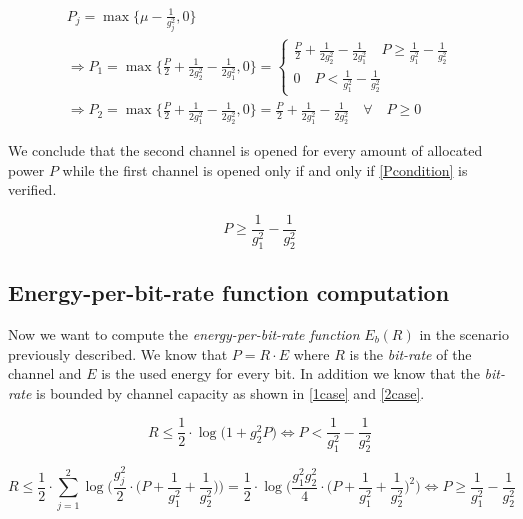 \begin{equation}
	\begin{gathered}
	 P_j = \max\Big\{\mu - \frac{1}{g_j^2},0\Big\} \\
	 \Rightarrow P_1= \max\Big\{\frac{P}{2} + \frac{1}{2g_2^2} - \frac{1}{2g_1^2},0\Big\} = \begin{cases}
	  \frac{P}{2} + \frac{1}{2g_2^2} - \frac{1}{2g_1^2} \quad P \geq \frac{1}{g_1^2} - \frac{1}{g_2^2} \\
		0 \quad P < \frac{1}{g_1^2} - \frac{1}{g_2^2}
	 \end{cases} \\
	 \Rightarrow P_2= \max\Big\{\frac{P}{2} + \frac{1}{2g_1^2} - \frac{1}{2g_2^2},0\Big\} = \frac{P}{2} + \frac{1}{2g_1^2} - \frac{1}{2g_2^2} \quad \forall \quad P \geq 0
	\end{gathered}
\end{equation}

We conclude that the second channel is opened for every amount of allocated power $P$ while the first channel is opened only if and only if \eqref{Pcondition} is verified.

\begin{equation}
	P \geq \frac{1}{g_1^2} - \frac{1}{g_2^2}
	\label{Pcondition}
\end{equation}

\subsection{Energy-per-bit-rate function computation}

Now we want to compute the \textit{energy-per-bit-rate function} $E_b(R)$ in the scenario previously described. We know that $P = R \cdot E$ where $R$ is the \textit{bit-rate} of the channel and $E$ is the used energy for every bit. In addition we know that the \textit{bit-rate} is bounded by channel capacity as shown in \eqref{1case} and \eqref{2case}.

\begin{equation}
		R \leq \frac{1}{2} \cdot \log\big( 1 + g_2^2P \big) \Leftrightarrow P < \frac{1}{g_1^2} - \frac{1}{g_2^2}
		\label{1case}
\end{equation}


\begin{equation}
		R \leq \frac{1}{2} \cdot \sum_{j=1}^2 \log\Big(\frac{g_j^2}{2} \cdot \Big(P+\frac{1}{g_1^2} + \frac{1}{g_2^2}\Big)\Big)= \frac{1}{2} \cdot \log\Big(\frac{g_1^2 g_2^2}{4} \cdot \Big(P+\frac{1}{g_1^2} + \frac{1}{g_2^2}\Big)^2\Big) \Leftrightarrow P \geq \frac{1}{g_1^2} - \frac{1}{g_2^2}
		\label{2case}
\end{equation}


